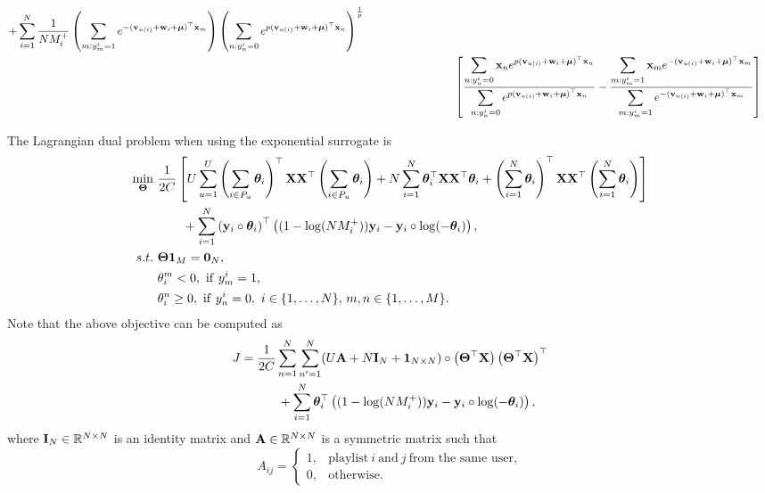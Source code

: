 \begin{equation*}
\begin{aligned}
  + \sum_{i=1}^N \frac{1}{N M_i^+} 
    \left( \sum_{m: y_m^i = 1} e^{-(\mathbf{v}_{u(i)} + \mathbf{w}_i + \bm{\mu})^\top \mathbf{x}_m} \right)
    \left( \sum_{n: y_n^i = 0} e^{p (\mathbf{v}_{u(i)} + \mathbf{w}_i + \bm{\mu})^\top \mathbf{x}_n} \right)^\frac{1}{p} \\
& \hspace{8em} \left[ 
    \frac{ \displaystyle \sum_{n: y_n^i = 0} \mathbf{x}_n e^{p (\mathbf{v}_{u(i)} + \mathbf{w}_i + \bm{\mu})^\top \mathbf{x}_n} }
         { \displaystyle \sum_{n: y_n^i = 0} e^{p (\mathbf{v}_{u(i)} + \mathbf{w}_i + \bm{\mu})^\top \mathbf{x}_n} }
    - \frac{ \displaystyle \sum_{m: y_m^i = 1} \mathbf{x}_m e^{-(\mathbf{v}_{u(i)} + \mathbf{w}_i + \bm{\mu})^\top \mathbf{x}_m} }
           { \displaystyle \sum_{m: y_m^i = 1} e^{-(\mathbf{v}_{u(i)} + \mathbf{w}_i + \bm{\mu})^\top \mathbf{x}_m} } \right]
\end{aligned}
\end{equation*}


The Lagrangian dual problem when using the exponential surrogate is
\begin{equation}
\label{eq:dual_nsr}
\begin{aligned}
\min_{\Thetabm} \ & \frac{1}{2 C} \left[
     U \sum_{u=1}^U \left( \sum_{i \in P_u} \thetabm_i \right)^\top \X \X^\top \left( \sum_{i \in P_u} \thetabm_i \right)
   + N \sum_{i=1}^N \thetabm_i^\top \X \X^\top \thetabm_i
   + \left( \sum_{i=1}^N \thetabm_i \right)^\top \X \X^\top \left( \sum_{i=1}^N \thetabm_i \right) \right] \\
& \hspace{2em}
   + \sum_{i=1}^N \left( \y_i \circ \thetabm_i \right)^\top \left( (1 - \log(N M_i^+)) \y_i - \y_i \circ \log(-\thetabm_i) \right), \\
s.t. \ 
& \Thetabm \one_M = \zero_N, \\
& \theta_i^m < 0, \ \mathrm{if} \ y_m^i = 1, \\
& \theta_i^n \ge 0, \ \mathrm{if} \ y_n^i = 0, \ i \in \{1,\dots,N\}, \, m,n \in \{1,\dots,M\}.
\end{aligned}
\end{equation}
Note that the above objective can be computed as
\begin{equation*}
\begin{aligned}
J &= \frac{1}{2 C} \sum_{n=1}^N \sum_{n'=1}^N (U \mathbf{A} + N \mathbf{I}_N + \mathbf{1}_{N \times N}) 
     \circ \left( \mathbf{\Theta}^\top \mathbf{X} \right) \left( \mathbf{\Theta}^\top \mathbf{X} \right)^\top \\
& \hspace{3em}
     + \sum_{i=1}^N \bm{\theta}_i^\top \left( (1 - \log(N M_i^+)) \mathbf{y}_i - \mathbf{y}_i \circ \log(-\bm{\theta}_i) \right),
\end{aligned}
\end{equation*}
where $\mathbf{I}_N \in \mathbb{R}^{N \times N}$ is an identity matrix and $\mathbf{A} \in \mathbb{R}^{N \times N}$ is a symmetric matrix such that
\begin{equation*}
A_{ij} = 
\begin{cases}
1, & \text{playlist} \ i \ \text{and} \ j \ \text{from the same user}, \\
0, & \text{otherwise}.
\end{cases}
\end{equation*}

